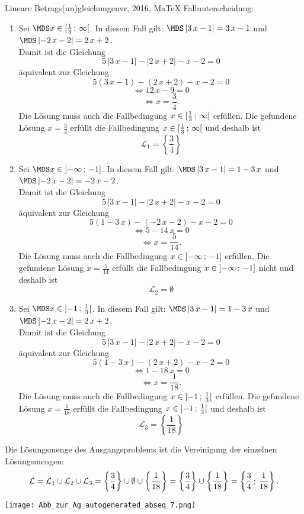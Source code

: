 \begin{MAufgabe}{Lineare Betrags(un)gleichungen}{vr, 2016, MaTeX}
 Fallunterscheidung: 

 \begin{enumerate} 
 \item Sei $ \MDS x\in[ \frac{1}{3} \, \MIntvlSep \, \infty\MoIr $. 
 In diesem Fall gilt: 
  $ \MDS \left| 3\, x - 1\right|=3\, x - 1$ und $ \MDS \left|  - 2\, x - 2\right|=2\, x + 2$. \\ 
 Damit ist die Gleichung 
 $$ 
5\, \left|3\, x - 1\right| - \left|2\, x + 2\right| - x - 2= 0
$$
 \"aquivalent zur Gleichung
 $$ 
5\left(3\, x - 1\right)-\left( 2\, x + 2\right)- x-2= 0 
$$  
$$ 
 \Leftrightarrow 12\, x - 9= 0 
$$  
$$ \Leftrightarrow x = \frac{3}{4} . 
 $$ 
 Die L\"osung muss auch die Fallbedingung $x\in [ \frac{1}{3} \, ; \, \infty[\mbox{}  $ erf\"ullen. Die gefundene L\"osung $x=\frac{3}{4}$ erf\"ullt die Fallbedingung  $x\in [ \frac{1}{3} \, ; \, \infty[\mbox{} $ und deshalb ist  $$
 \mathcal{L}_{1}=\left\{\frac{3}{4}\right\}
 $$ 
\item Sei $ \MDS x\in\MoIl  -\infty \, \MIntvlSep \, -1]$. 
 In diesem Fall gilt: 
  $ \MDS \left| 3\, x - 1\right|=1 - 3\, x$ und $ \MDS \left|  - 2\, x - 2\right|= - 2\, x - 2$. \\ 
 Damit ist die Gleichung 
 $$ 
5\, \left|3\, x - 1\right| - \left|2\, x + 2\right| - x - 2= 0
$$
 \"aquivalent zur Gleichung
 $$ 
5\left(1 - 3\, x\right)-\left(  - 2\, x - 2\right)- x-2= 0 
$$  
$$ 
 \Leftrightarrow 5 - 14\, x= 0 
$$  
$$ \Leftrightarrow x = \frac{5}{14} . 
 $$ 
 Die L\"osung muss auch die Fallbedingung $x\in \mbox{}]\mathopen{}  -\infty \, ; \, -1] $ erf\"ullen. Die gefundene L\"osung $x=\frac{5}{14}$ erf\"ullt die Fallbedingung  $x\in \mbox{}]\mathopen{}  -\infty \, ; \, -1]$ nicht und deshalb ist  $$
 \mathcal{L}_{2}=\emptyset 
 $$ 
\item Sei $ \MDS x\in\MoIl  -1 \, \MIntvlSep \, \frac{1}{3}\MoIr $. 
 In diesem Fall gilt: 
  $ \MDS \left| 3\, x - 1\right|=1 - 3\, x$ und $ \MDS \left|  - 2\, x - 2\right|=2\, x + 2$. \\ 
 Damit ist die Gleichung 
 $$ 
5\, \left|3\, x - 1\right| - \left|2\, x + 2\right| - x - 2= 0
$$
 \"aquivalent zur Gleichung
 $$ 
5\left(1 - 3\, x\right)-\left( 2\, x + 2\right)- x-2= 0 
$$  
$$ 
 \Leftrightarrow 1 - 18\, x= 0 
$$  
$$ \Leftrightarrow x = \frac{1}{18} . 
 $$ 
 Die L\"osung muss auch die Fallbedingung $x\in \mbox{}]\mathopen{}  -1 \, ; \, \frac{1}{3}[\mbox{}  $ erf\"ullen. Die gefundene L\"osung $x=\frac{1}{18}$ erf\"ullt die Fallbedingung  $x\in \mbox{}]\mathopen{}  -1 \, ; \, \frac{1}{3}[\mbox{} $ und deshalb ist  $$
 \mathcal{L}_{3}=\left\{\frac{1}{18}\right\}
 $$ 
 \end{enumerate} 
  Die L\"osungsmenge des Ausgangsproblems ist die Vereinigung der einzelnen L\"osungsmengen: 
$$ \mathcal{L} = \mathcal{L}_{1} \cup \mathcal{L}_{2} \cup \mathcal{L}_{3} 
 = \left\{\frac{3}{4}\right\}\cup \emptyset\cup \left\{\frac{1}{18}\right\} 
  =\left\{\frac{3}{4}\right\}\cup\left\{\frac{1}{18}\right\} 
  = \left\{\frac{3}{4}\, ; \,\frac{1}{18}\right\} 
 . $$ 
 
 \begin{center}
 \texttt{[image: Abb\_zur\_Ag\_autogenerated\_abseq\_7.png]} \end{center}
 
\else\relax\fi
 \end{MAufgabe}